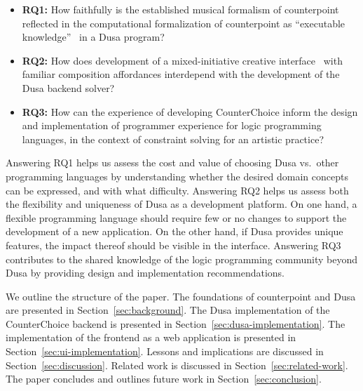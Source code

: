 \begin{itemize}
  \item \textbf{RQ1:} How faithfully is the established musical formalism of counterpoint reflected in the computational formalization of counterpoint as ``executable knowledge''~\cite{harmer2012executable} in a Dusa program?
  \item \textbf{RQ2:} How does development of a mixed-initiative creative 
    interface~\cite{deterding2017mixed} with familiar 
    composition affordances interdepend with the 
    development of the Dusa backend solver? 

  \item \textbf{RQ3:} How can the experience of developing CounterChoice 
    inform the design and implementation of programmer experience for logic 
    programming languages, in the context of constraint solving for an artistic
    practice?
 
\end{itemize}

Answering RQ1 helps us assess the cost and value of choosing Dusa vs.\ other programming languages by understanding whether the desired domain concepts can be expressed, and with what difficulty.
Answering RQ2 helps us assess both the flexibility and uniqueness of Dusa as a development platform.
On one hand, a flexible programming language should require few or no changes to support the development of a new application.
On the other hand, if Dusa provides unique features, the impact thereof should be visible in the interface.
Answering RQ3 contributes to the shared knowledge of the logic programming community beyond Dusa by providing design and implementation recommendations.

We outline the structure of the paper.
The foundations of counterpoint and Dusa are presented in Section~\ref{sec:background}.
The Dusa implementation of the CounterChoice backend is presented in Section~\ref{sec:dusa-implementation}.
The implementation of the frontend as a web application is presented in Section~\ref{sec:ui-implementation}.
Lessons and implications are discussed in Section~\ref{sec:discussion}.
Related work is discussed in Section~\ref{sec:related-work}.
The paper concludes and outlines future work in Section~\ref{sec:conclusion}.

